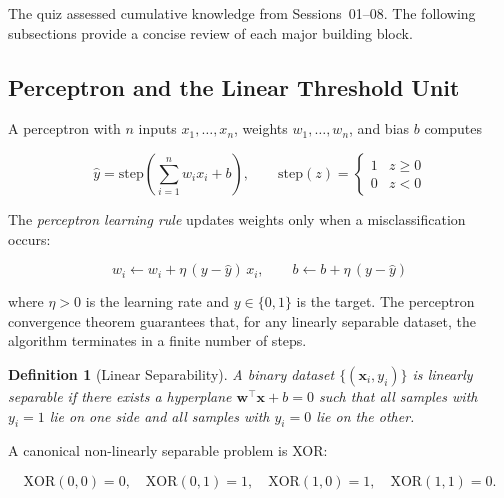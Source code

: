 \documentclass[12pt,a4paper]{article}
\newtheorem{definition}{Definition}[section]
\begin{document}
The quiz assessed cumulative knowledge from Sessions~01--08.  The
following subsections provide a concise review of each major building
block.

\subsection{Perceptron and the Linear Threshold Unit}
\label{ssec:perceptron}

A perceptron with $n$ inputs $x_1, \ldots, x_n$, weights
$w_1, \ldots, w_n$, and bias $b$ computes

\begin{equation}
  \hat{y} = \text{step}\!\left(\sum_{i=1}^{n} w_i x_i + b\right),
  \qquad
  \text{step}(z) = \begin{cases} 1 & z \geq 0 \\ 0 & z < 0 \end{cases}
  \label{eq:perceptron}
\end{equation}

\noindent
The \emph{perceptron learning rule} updates weights only when a
misclassification occurs:

\begin{equation}
  w_i \leftarrow w_i + \eta \,(y - \hat{y})\, x_i, \qquad
  b    \leftarrow b    + \eta \,(y - \hat{y})
  \label{eq:perceptron_update}
\end{equation}

\noindent
where $\eta > 0$ is the learning rate and $y \in \{0, 1\}$ is the
target.  The perceptron convergence theorem guarantees that, for any
linearly separable dataset, the algorithm terminates in a finite number
of steps.

\begin{definition}[Linear Separability]
\label{def:lin_sep}
A binary dataset $\{(\mathbf{x}_i, y_i)\}$ is \emph{linearly separable}
if there exists a hyperplane $\mathbf{w}^{\top}\mathbf{x} + b = 0$ such
that all samples with $y_i = 1$ lie on one side and all samples with
$y_i = 0$ lie on the other.
\end{definition}

A canonical non-linearly separable problem is XOR:

\begin{equation}
  \text{XOR}(0,0)=0,\quad
  \text{XOR}(0,1)=1,\quad
  \text{XOR}(1,0)=1,\quad
  \text{XOR}(1,1)=0.
  \label{eq:xor}
\end{equation}
\end{document}
